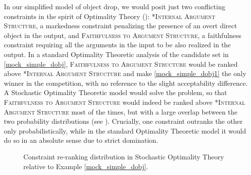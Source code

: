 In our simplified model of object drop, we would posit just two conflicting constraints in the spirit of Optimality Theory (): \textsc{*Internal Argument Structure}, a markedness constraint penalizing the presence of an overt direct object in the output, and \textsc{Faithfulness to Argument Structure}, a faithfulness constraint requiring all the arguments in the input to be also realized in the output. In a standard Optimality Theoretic analysis of the candidate set in \ref{mock_simple_dobj}, \textsc{Faithfulness to Argument Structure} would be ranked above \textsc{*Internal Argument Structure} and make \ref{mock_simple_dobj1} the only winner in the competition, with no reference to the slight acceptability difference. A Stochastic Optimality Theoretic model would solve the problem, so that \textsc{Faithfulness to Argument Structure} would indeed be ranked above \textsc{*Internal Argument Structure} most of the times, but with a large overlap between the two probability distributions (see ). Crucially, one constraint outranks the other only probabilistically, while in the standard Optimality Theoretic model it would do so in an absolute sense due to strict domination.

\begin{figure}[htb]
\caption{Constraint re-ranking distribution in Stochastic Optimality Theory relative to Example \ref{mock_simple_dobj}.}
\end{figure}

